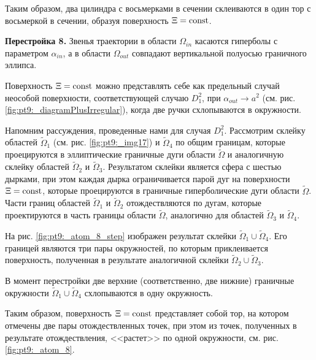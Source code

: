 Таким образом, два цилиндра с восьмерками в сечении склеиваются в один тор с восьмеркой в сечении, образуя поверхность $\Xi = \mathrm{const}$.

\textbf{Перестройка 8.} 
Звенья траектории в области $\Omega_{in}$ касаются гиперболы с параметром $\alpha_{in}$, а в области $\Omega_{out}$ совпадают вертикальной полуосью граничного эллипса.

Поверхность $\Xi = \mathrm{const}$ можно представлять себе как предельный случай неособой поверхности, соответствующей случаю $D_1^2$, при $\alpha_{out} \to a^2$ (см. рис. \ref{fig:pt9:_diagramPlusIrregular}), когда две ручки схлопываются в окружности.

Напомним рассуждения, проведенные нами для случая $D_1^2$. Рассмотрим склейку областей $\widetilde{\Omega}_1$ (см.  рис. \ref{fig:pt9:_img17}) и $\widetilde{\Omega}_4$  по общим границам, которые проецируются в эллиптические граничные дуги области $\widetilde{\Omega}$ и аналогичную склейку областей $\widetilde{\Omega}_2$ и $\widetilde{\Omega}_3$.
Результатом склейки является сфера с шестью дырками, при этом каждая дырка ограничивается парой дуг на поверхности $\Xi=\mathrm{const}$, которые проецируются в граничные гиперболические дуги области $\widetilde{\Omega}$. 
Части границ областей $\widetilde{\Omega}_1$ и $\widetilde{\Omega}_2$ отождествляются по дугам, которые проектируются в часть границы области $\widetilde{\Omega}$, аналогично для областей $\widetilde{\Omega}_3$ и $\widetilde{\Omega}_4$.

На рис. \ref{fig:pt9:_atom_8_step} изображен результат склейки $\widetilde{\Omega}_1 \cup \widetilde{\Omega}_4$. Его границей являются три пары окружностей, по которым приклеивается поверхность, полученная в результате аналогичной склейки $\widetilde{\Omega}_2 \cup \widetilde{\Omega}_3$. 

В момент перестройки две верхние (соответственно, две нижние) граничные окружности $\widetilde{\Omega}_1 \cup \widetilde{\Omega}_4$ схлопываются в одну окружность. 

Таким образом, поверхность $\Xi = \mathrm{const}$ представляет собой тор, на котором отмечены две пары отождествленных точек, при этом из точек, полученных в результате отождествления, <<растет>> по одной окружности, см. рис. \ref{fig:pt9:_atom_8}.

